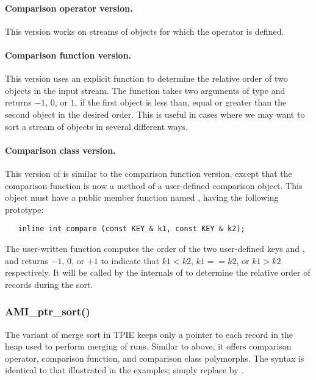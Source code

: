 \paragraph{Comparison operator version.} This version works on streams of
objects for which the operator \myverb{<} is defined. 

\paragraph{Comparison function version.}
This version uses an explicit function to determine the
relative order of two objects in the input stream. The function takes two
arguments of type  and returns $-1$, $0$, or $1$, if the first
object is less than, equal or greater than the second object in the desired
order. This is useful in cases where we may want to sort a stream of
objects in several different ways.  

\paragraph{Comparison class version.} 
This version of  is similar to the
comparison function version, except that the comparison
function is now a method of a user-defined comparison
object. This object must have a public member function named
, having the following prototype:
\begin{verbatim}
   inline int compare (const KEY & k1, const KEY & k2);
\end{verbatim}

The user-written  function computes the
order of the two user-defined keys  and
, and returns $-1$, $0$, or $+1$ to indicate that
$k1<k2$, $k1==k2$, or $k1>k2$ respectively.
It will be called by the internals of  to
determine the relative order of records during the sort.



\subsubsection{AMI\_ptr\_sort()}

The  variant of merge sort in TPIE
keeps only a pointer to each record in the heap used to
perform merging of runs. Similar to 
above, it offers comparison operator, comparison function,
and comparison class polymorphs. The syntax is identical to
that illustrated in the  examples; simply
replace  by .


